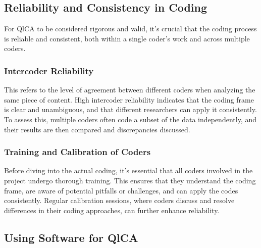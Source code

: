 \documentclass[
  b5paper]{book}
\begin{document}
\hypertarget{reliability-and-consistency-in-coding}{%
\subsection*{Reliability and Consistency in Coding}\label{reliability-and-consistency-in-coding}}

For QlCA to be considered rigorous and valid, it's crucial that the coding process is reliable and consistent, both within a single coder's work and across multiple coders.

\hypertarget{intercoder-reliability}{%
\subsubsection*{Intercoder Reliability}\label{intercoder-reliability}}

This refers to the level of agreement between different coders when analyzing the same piece of content. High intercoder reliability indicates that the coding frame is clear and unambiguous, and that different researchers can apply it consistently. To assess this, multiple coders often code a subset of the data independently, and their results are then compared and discrepancies discussed.

\hypertarget{training-and-calibration-of-coders}{%
\subsubsection*{Training and Calibration of Coders}\label{training-and-calibration-of-coders}}

Before diving into the actual coding, it's essential that all coders involved in the project undergo thorough training. This ensures that they understand the coding frame, are aware of potential pitfalls or challenges, and can apply the codes consistently. Regular calibration sessions, where coders discuss and resolve differences in their coding approaches, can further enhance reliability.

\hypertarget{using-software-for-qlca}{%
\subsection*{Using Software for QlCA}\label{using-software-for-qlca}}
\end{document}
